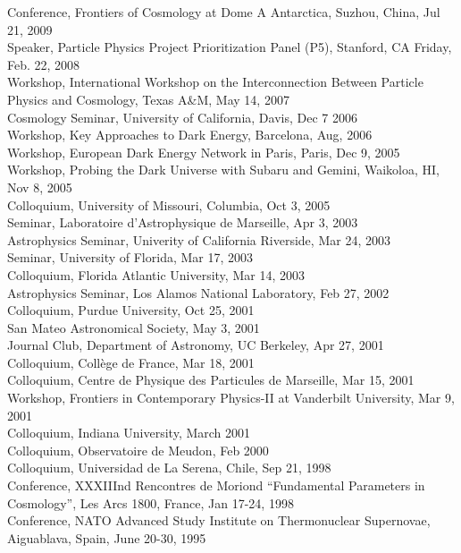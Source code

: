 \documentclass[line, margin]{res}
\begin{document}
\begin{resume}
Conference, Frontiers of Cosmology at Dome A Antarctica, Suzhou, China, Jul 21, 2009\\
Speaker, Particle Physics Project Prioritization Panel (P5), Stanford, CA Friday, Feb. 22, 2008\\
Workshop, International Workshop on the Interconnection Between
Particle Physics and Cosmology, Texas A\&M, May 14, 2007 \\
Cosmology Seminar, University of California, Davis, Dec 7 2006\\
Workshop, Key Approaches to Dark Energy, Barcelona,  Aug, 2006\\
Workshop, European Dark Energy Network in Paris, Paris, Dec 9, 2005 \\
Workshop, Probing the Dark Universe with Subaru and Gemini, Waikoloa, HI, Nov 8, 2005\\
Colloquium, University of Missouri, Columbia, Oct 3, 2005\\
Seminar, Laboratoire d'Astrophysique de Marseille, Apr 3, 2003\\
Astrophysics Seminar, Univerity of California Riverside, Mar 24, 2003\\
Seminar, University of Florida, Mar 17, 2003\\
Colloquium, Florida Atlantic University, Mar 14, 2003\\
Astrophysics Seminar, Los Alamos National Laboratory, Feb 27, 2002\\
Colloquium, Purdue University, Oct 25, 2001\\
San Mateo Astronomical Society, May 3, 2001\\
Journal Club, Department of Astronomy, UC Berkeley, Apr 27, 2001\\
Colloquium, Coll\`ege de France, Mar 18, 2001\\
Colloquium, Centre de Physique des Particules de Marseille, Mar 15, 2001\\
Workshop, Frontiers in Contemporary Physics-II at Vanderbilt University, Mar 9, 2001\\
Colloquium, Indiana University, March 2001\\
Colloquium, Observatoire de Meudon, Feb 2000\\
Colloquium, Universidad de La Serena,
Chile, Sep 21, 1998\\
Conference,  XXXIIInd
Rencontres de Moriond ``Fundamental Parameters in Cosmology'',
Les Arcs 1800, France, Jan 17-24, 1998\\
Conference, NATO Advanced Study Institute on Thermonuclear Supernovae, Aiguablava,
Spain, June 20-30, 1995\\


\end{resume}
\end{document}
